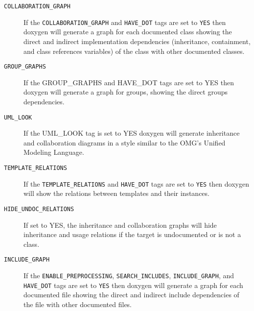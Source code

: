 \begin{description}
\label{config_cfg_collaboration_graph}
\hypertarget{config_cfg_collaboration_graph}{}
 \item[{\tt COLLABORATION\_\-GRAPH} ] If the {\tt COLLABORATION\_\-GRAPH} and {\tt HAVE\_\-DOT} tags are set to {\tt YES} then doxygen will generate a graph for each documented class showing the direct and indirect implementation dependencies (inheritance, containment, and class references variables) of the class with other documented classes.

\label{config_cfg_group_graphs}
\hypertarget{config_cfg_group_graphs}{}
 \item[{\tt GROUP\_\-GRAPHS} ] If the GROUP\_\-GRAPHS and HAVE\_\-DOT tags are set to YES then doxygen will generate a graph for groups, showing the direct groups dependencies.

\label{config_cfg_uml_look}
\hypertarget{config_cfg_uml_look}{}
 \item[{\tt UML\_\-LOOK} ] If the UML\_\-LOOK tag is set to YES doxygen will generate inheritance and collaboration diagrams in a style similar to the OMG's Unified Modeling Language.

\label{config_cfg_template_relations}
\hypertarget{config_cfg_template_relations}{}
 \item[{\tt TEMPLATE\_\-RELATIONS} ] If the {\tt TEMPLATE\_\-RELATIONS} and {\tt HAVE\_\-DOT} tags are set to {\tt YES} then doxygen will show the relations between templates and their instances.

\label{config_cfg_hide_undoc_relations}
\hypertarget{config_cfg_hide_undoc_relations}{}
 \item[{\tt HIDE\_\-UNDOC\_\-RELATIONS} ] If set to YES, the inheritance and collaboration graphs will hide inheritance and usage relations if the target is undocumented or is not a class.

\label{config_cfg_include_graph}
\hypertarget{config_cfg_include_graph}{}
 \item[{\tt INCLUDE\_\-GRAPH} ] If the {\tt ENABLE\_\-PREPROCESSING}, {\tt SEARCH\_\-INCLUDES}, {\tt INCLUDE\_\-GRAPH}, and {\tt HAVE\_\-DOT} tags are set to {\tt YES} then doxygen will generate a graph for each documented file showing the direct and indirect include dependencies of the file with other documented files.


\end{description}
